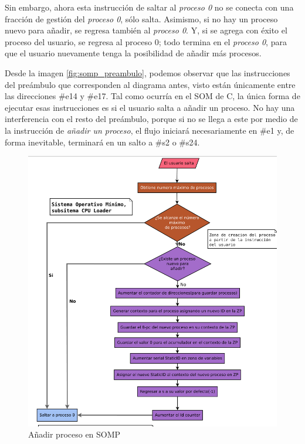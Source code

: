 \documentclass[letterpaper,12pt,oneside]{book}
\begin{document}
		 		Sin embargo, ahora esta
		 		instrucción de saltar al \textit{proceso 0} 
		 		no se conecta con una fracción de gestión del \textit{proceso 0}, sólo salta. Asimismo, si no hay 
		 		un proceso nuevo para añadir, se regresa también al \textit{proceso 0}.
		 		 Y, si se agrega con éxito el proceso del usuario, se regresa al proceso 0; todo 
		 		termina
		 		en el \textit{proceso 0}, para que el usuario nuevamente tenga la posibilidad de añadir más procesos. 
     
                Desde la imagen \ref{fig:somp_preambulo}, podemos observar que las instrucciones del preámbulo que corresponden
                al diagrama antes, visto están únicamente entre las direcciones \#e14 y \#e17. Tal como ocurría en el SOM de C, la única
		 		forma de ejecutar esas instrucciones es si el usuario salta a añadir un proceso. No hay una interferencia con el resto del preámbulo, 
		 		porque si no se llega a este por medio de la instrucción de \textit{añadir un proceso}, 
		 		el flujo iniciará necesariamente en \#e1 y, de forma inevitable, terminará en un salto a \#s2 o \#s24.
		 		
		 	
			\begin{figure}[h]		
				\centering
				\includegraphics[scale=0.43]{media/Paralela/Diagrama_SOP_add_process.png}
				\caption{ Añadir proceso en SOMP}
				\label{fig:diag_sop_add_process}
			\end{figure}	 		 			
\end{document}
